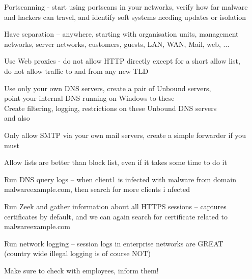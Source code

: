 \documentclass[Screen16to9,17pt]{foils}
\begin{document}
\begin{list2}
\item Portscanning - start using portscans in your networks, verify how far malware and hackers can travel, and identify soft systems needing updates or isolation
\item Have separation -- anywhere, starting with organisation units, management networks, server networks, customers, guests, LAN, WAN, Mail, web, ...
\item Use Web proxies - do not allow HTTP directly except for a short allow list, \\
do not allow traffic to and from any new TLD
\item Use only your own DNS servers, create a pair of Unbound servers, \\
point your internal DNS running on Windows to these\\
Create filtering, logging, restrictions on these Unbound DNS servers\\
 and also 
\item Only allow SMTP via your own mail servers, create a simple forwarder if you must
\end{list2}

Allow lists are better than block list, even if it takes some time to do it



\begin{list2}
\item Run DNS query logs -- when client1 is infected with malware from domain malwareexample.com, then search for more clients i
nfected
\item Run Zeek and gather information about all HTTPS sessions -- captures certificates by default, and we can again search for
certificate related to malwareexample.com
\item Run network logging -- session logs in enterprise networks are GREAT \\
(country wide illegal logging is of course NOT)
\end{list2}

Make sure to check with employees, inform them!

\end{document}
